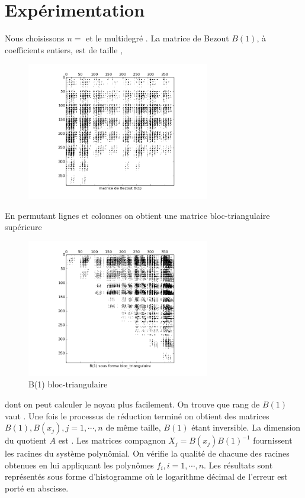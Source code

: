 \documentclass{standalone}
\begin{document}
  \section{Expérimentation}
  Nous choisissons $n=

$ et le multidegré $

$.
La matrice de Bezout $B(1)$, à coefficients entiers, est de taille ,
\begin{figure}[!ht]
\includegraphics[width=8cm]{../png/bez.png}
\end{figure}
En permutant lignes et colonnes on obtient une matrice bloc-triangulaire supérieure
\begin{figure}[!ht]
\includegraphics[width=8cm]{../png/beztri.png}
  \caption{B(1) bloc-triangulaire}
\end{figure}
dont on peut calculer le noyau plus facilement. On trouve que rang de $B(1)$ vaut . Une fois le processus de réduction terminé on obtient des matrices $B(1), B(x_j), j=1,\cdots,n$ de même taille, $B(1)$ étant inversible. La dimension du quotient $A$ est . Les matrices compagnon $X_j = B(x_j)B(1)^{-1}$ fournissent les racines du système polynômial. On vérifie la qualité de chacune des racines obtenues en lui appliquant les polynômes $f_i, i=1,\cdots,n$. Les résultats sont représentés sous forme d'histogramme o\`u le logarithme décimal de l'erreur est porté en abscisse.
\end{document}
